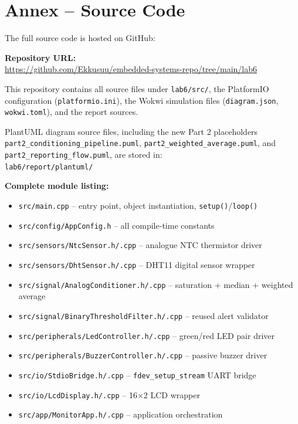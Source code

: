\documentclass[12pt]{article}
\begin{document}
\FloatBarrier
\section*{Annex -- Source Code}

The full source code is hosted on GitHub:

\bigskip
\noindent\textbf{Repository URL:}\\
\url{https://github.com/Ekkusuu/embedded-systems-repo/tree/main/lab6}

\bigskip
\noindent This repository contains all source files under \texttt{lab6/src/}, the PlatformIO configuration (\texttt{platformio.ini}), the Wokwi simulation files (\texttt{diagram.json}, \texttt{wokwi.toml}), and the report sources.

\bigskip
\noindent PlantUML diagram source files, including the new Part 2 placeholders \texttt{part2\_conditioning\_pipeline.puml}, \texttt{part2\_weighted\_average.puml}, and \texttt{part2\_reporting\_flow.puml}, are stored in:\\
\texttt{lab6/report/plantuml/}

\bigskip
\noindent\textbf{Complete module listing:}
\begin{itemize}
    \item \texttt{src/main.cpp} -- entry point, object instantiation, \texttt{setup()}/\texttt{loop()}
    \item \texttt{src/config/AppConfig.h} -- all compile-time constants
    \item \texttt{src/sensors/NtcSensor.h/.cpp} -- analogue NTC thermistor driver
    \item \texttt{src/sensors/DhtSensor.h/.cpp} -- DHT11 digital sensor wrapper
    \item \texttt{src/signal/AnalogConditioner.h/.cpp} -- saturation + median + weighted average
    \item \texttt{src/signal/BinaryThresholdFilter.h/.cpp} -- reused alert validator
    \item \texttt{src/peripherals/LedController.h/.cpp} -- green/red LED pair driver
    \item \texttt{src/peripherals/BuzzerController.h/.cpp} -- passive buzzer driver
    \item \texttt{src/io/StdioBridge.h/.cpp} -- \texttt{fdev\_setup\_stream} UART bridge
    \item \texttt{src/io/LcdDisplay.h/.cpp} -- 16$\times$2 LCD wrapper
    \item \texttt{src/app/MonitorApp.h/.cpp} -- application orchestration
\end{itemize}
\end{document}
